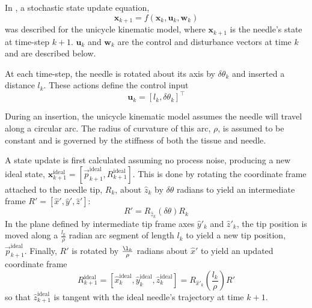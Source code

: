 \documentclass[journal,transmag]{IEEEtran}
\newcommand{\bvar}[2]{\mathbf{#1}_{#2}}
\begin{document}
In \cite{adebar2014recursive}, a stochastic state update equation,
\begin{equation*}
\bvar{x}{k+1} = f(\bvar{x}{k}, \bvar{u}{k}, \bvar{w}{k})
\end{equation*}  
was described for the unicycle kinematic model, where $\bvar{x}{k+1}$ is the needle's state at time-step $k+1$. $\bvar{u}{k}$ and $\bvar{w}{k}$ are the control and disturbance vectors at time $k$ and are described below.  

At each time-step, the needle is rotated about its axis by $\delta \theta_k$ and inserted a distance $l_k$.  These actions define the control input 
\begin{equation*}
\bvar{u}{k} = \left[l_k, \delta\theta_k\right]^\top
\end{equation*}  

During an insertion, the unicycle kinematic model assumes the needle will travel along a circular arc.  The radius of curvature of this arc, $\rho$, is assumed to be constant and is governed by the stiffness of both the tissue and needle.  

A state update is first calculated assuming no process noise, producing a new ideal state, $\bvar{x}{k+1}^{\text{ideal}} = \left[\vec{p}^{\text{ideal}}_{k+1}, R^{\text{ideal}}_{k+1}\right]$.  This is done by rotating the coordinate frame attached to the needle tip, $R_k$, about $\hat{z}_k$ by $\delta \theta$ radians to yield an intermediate frame $R' = [\hat{x}', \hat{y}', \hat{z}']$:
\begin{equation*}
R' = R_{\hat{z}_k}(\delta\theta)R_k
\end{equation*}
In the plane defined by intermediate tip frame axes $\hat{y}'_k$ and $\hat{z}'_k$, the tip position is moved along a $\frac{l_k}{\rho}$ radian arc segment of length $l_k$ to yield a new tip position, $\vec{p}^{\text{ideal}}_{k+1}$.  Finally, $R'$ is rotated by $\frac{\l_k}{\rho}$ radians about $\hat{x}'$ to yield an updated coordinate frame
\begin{equation*}
R^{\text{ideal}}_{k+1} = [\hat{x}^{\text{ideal}}_k, \hat{y}^{\text{ideal}}_k, \hat{z}^{\text{ideal}}_k] = R_{\hat{x}'_k}\left(\frac{l_k}{\rho}\right)R'
\end{equation*}
so that $\hat{z}^{\text{ideal}}_{k+1}$ is tangent with the ideal needle's trajectory at time $k+1$.  
\end{document}
